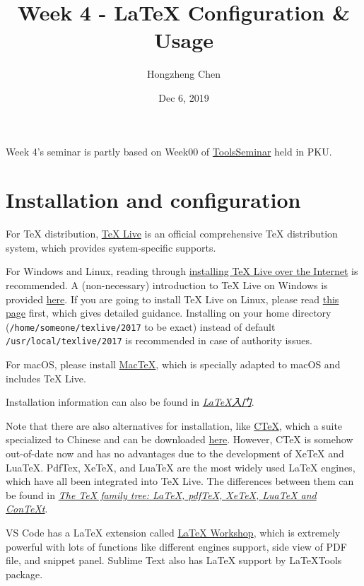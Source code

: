 \documentclass[english]{../TexTemplate/thesis}
\title{Week 4 - \LaTeX{} Configuration \& Usage}
\author{Hongzheng Chen}
\date{Dec 6, 2019}
\begin{document}
\maketitle

Week 4's seminar is partly based on Week00 of \href{https://github.com/pppppass/ToolsSeminar}{ToolsSeminar} held in PKU.
 
\section{Installation and configuration}
For \TeX{} distribution, \href{http://www.tug.org/texlive/}{\TeX{} Live} is an official comprehensive TeX distribution system, which provides system-specific supports.

For Windows and Linux, reading through \href{http://www.tug.org/texlive/acquire-netinstall.html}{installing \TeX{} Live over the Internet} is recommended. A (non-necessary) introduction to \TeX{} Live on Windows is provided \href{http://www.tug.org/texlive/windows.html}{here}. If you are going to install \TeX{} Live on Linux, please read \href{http://www.tug.org/texlive/quickinstall.html}{this page} first, which gives detailed guidance. Installing on your home directory (\verb"/home/someone/texlive/2017" to be exact) instead of default \verb"/usr/local/texlive/2017" is recommended in case of authority issues.

For macOS, please install \href{http://www.tug.org/mactex/}{MacTeX}, which is specially adapted to macOS and includes \TeX{} Live.

Installation information can also be found in \href{https://item.jd.com/11258469.html}{\emph{\LaTeX 入门}}.

Note that there are also alternatives for installation, like \href{http://www.ctex.org/CTeX}{CTeX}, which a suite specialized to Chinese and can be downloaded \href{http://www.ctex.org/CTeXDownload}{here}. However, CTeX is somehow out-of-date now and has no advantages due to the development of XeTeX and LuaTeX.
PdfTex, XeTeX, and LuaTeX are the most widely used \LaTeX{} engines, which have all been integrated into \TeX{} Live.
The differences between them can be found in \href{https://www.overleaf.com/learn/latex/Articles/The_TeX_family_tree:_LaTeX,_pdfTeX,_XeTeX,_LuaTeX_and_ConTeXt}{\emph{The TeX family tree: LaTeX, pdfTeX, XeTeX, LuaTeX and ConTeXt}}.

VS Code has a \LaTeX{} extension called \href{https://marketplace.visualstudio.com/items?itemName=James-Yu.latex-workshop}{LaTeX Workshop}, which is extremely powerful with lots of functions like different engines support, side view of PDF file, and snippet panel. Sublime Text also has \LaTeX{} support by LaTeXTools package.
\end{document}
